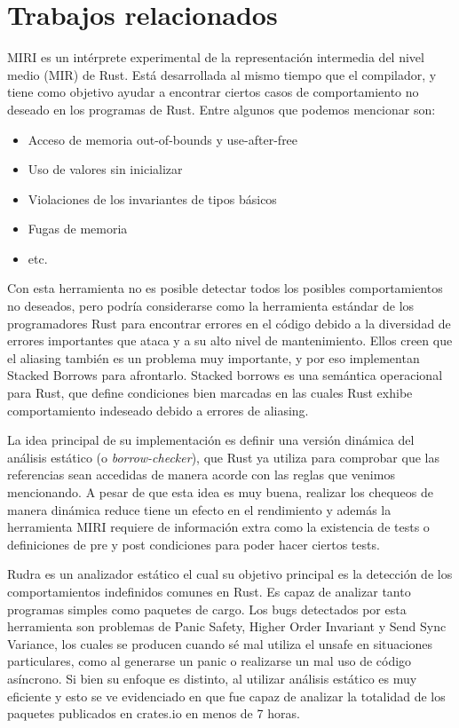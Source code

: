 \section{Trabajos relacionados}

MIRI \cite{miri} es un intérprete experimental de la representación intermedia del nivel medio (MIR) de Rust. Está desarrollada al mismo tiempo que el compilador, y tiene como objetivo ayudar a encontrar ciertos casos de comportamiento no deseado en los programas de Rust. Entre algunos que podemos mencionar son:
\begin{itemize}
    \item Acceso de memoria out-of-bounds y use-after-free
    \item Uso de valores sin inicializar
    \item Violaciones de los invariantes de tipos básicos
    \item Fugas de memoria
    \item etc.
\end{itemize}
Con esta herramienta no es posible detectar todos los posibles comportamientos no deseados, pero podría considerarse como la herramienta estándar de los programadores Rust para encontrar errores en el código debido a la diversidad de errores importantes que ataca y a su alto nivel de mantenimiento. Ellos creen que el aliasing también es un problema muy importante, y por eso implementan Stacked Borrows \cite{stackedborrows} para afrontarlo. Stacked borrows es una semántica operacional  para Rust, que define condiciones bien marcadas en las cuales Rust exhibe comportamiento indeseado debido a errores de aliasing.

La idea principal de su implementación es definir una versión dinámica del análisis estático (o \textit{borrow-checker}), que Rust ya utiliza para comprobar que las referencias sean accedidas de manera acorde con las reglas que venimos mencionando. A pesar de que esta idea es muy buena, realizar los chequeos de manera dinámica reduce tiene un efecto en el rendimiento y además la herramienta MIRI requiere de información extra como la existencia de tests o definiciones de pre y post condiciones para poder hacer ciertos tests.

Rudra \cite{rudra} es un analizador estático el cual su objetivo principal es la detección de los comportamientos indefinidos comunes en Rust. Es capaz de analizar tanto programas simples como paquetes de cargo. Los bugs detectados por esta herramienta son problemas de Panic Safety, Higher Order Invariant y Send Sync Variance, los cuales se producen cuando sé mal utiliza el unsafe en situaciones particulares, como al generarse un panic o realizarse un mal uso de código asíncrono. Si bien su enfoque es distinto, al utilizar análisis estático es muy eficiente y esto se ve evidenciado en que fue capaz de analizar la totalidad de los paquetes publicados en crates.io en menos de 7 horas.

